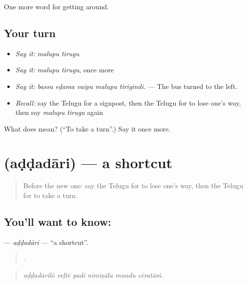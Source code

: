 \begin{grammarlens}[title={What you've built}]
One more word for getting around.
\end{grammarlens}

\subsection*{Your turn}
\begin{itemize}
\raggedright
  \item \emph{Say it:} \emph{malupu tirugu}
  \item \emph{Say it:} \emph{malupu tirugu}, once more
  \item \emph{Say it:} \emph{bassu eḍama vaipu malupu tirigindi.} — The bus turned to the left.
  \item \emph{Recall:} say the Telugu for a signpost, then the Telugu for to lose one's way, then say \emph{malupu tirugu} again
\end{itemize}

\begin{tcolorbox}[breakable,colback=teal!4,colframe=teal!35!black,title={Before you move on}]
What does   mean? (\textquotedblleft{}To take a turn\textquotedblright{}.) Say it once more.
\end{tcolorbox}
\section[\texorpdfstring{\te{అడ్డదారి} (aḍḍadāri)}{అడ్డదారి (aḍḍadāri)}]{ (aḍḍadāri) — a shortcut}

\label{lesson:TE-C448-addadari}



\begin{quote}
Before the new one: say the Telugu for to lose one's way, then the Telugu for to take a turn.
\end{quote}

\subsection*{You'll want to know: }
\textbf{} — \emph{aḍḍadāri} — \textquotedblleft{}a shortcut\textquotedblright{}.

\begin{quote}
     .
\end{quote}

\begin{quote}
\emph{aḍḍadārilō veḷtē padi nimiṣālu mundu cēratāṁ.}
\end{quote}


